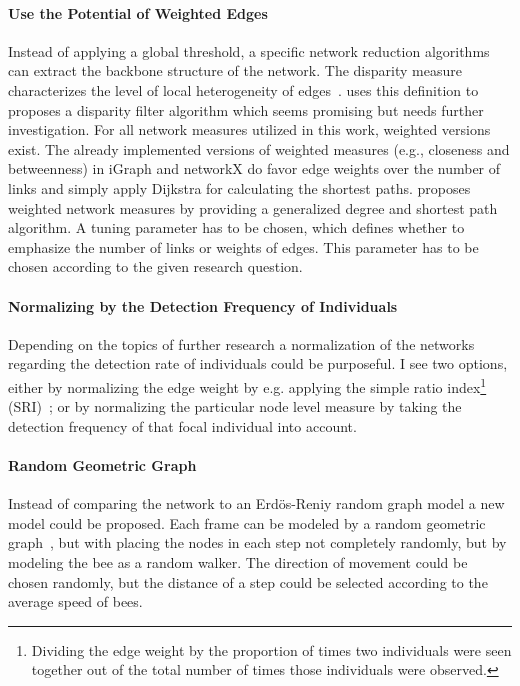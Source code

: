\paragraph{Use the Potential of Weighted Edges}
Instead of applying a global threshold, a specific network reduction algorithms can extract the backbone structure of the network. The disparity measure characterizes the level of local heterogeneity of edges~\cite{barthelemy2003spatial}. \textcite{serrano2009extracting} uses this definition to proposes a disparity filter algorithm which seems promising but needs further investigation. 
For all network measures utilized in this work, weighted versions exist. The already implemented versions of weighted measures (e.g., closeness and betweenness) in iGraph and networkX do favor edge weights over the number of links and simply apply Dijkstra for calculating the shortest paths. \textcite{opsahl2010node} proposes weighted network measures by providing a generalized degree and shortest path algorithm. A tuning parameter has to be chosen, which defines whether to emphasize the number of links or weights of edges. This parameter has to be chosen according to the given research question.

\paragraph{Normalizing by the Detection Frequency of Individuals}
Depending on the topics of further research a normalization of the networks regarding the detection rate of individuals could be purposeful. 
I see two options, either by normalizing the edge weight by e.g. applying the simple ratio index\footnote{Dividing the edge weight by the proportion of times two individuals were seen together out of the total number of times those individuals were observed.} (SRI)~\cite{formica2012fitness}; or by normalizing the particular node level measure by taking the detection frequency of that focal individual into account.

\paragraph{Random Geometric Graph}
Instead of comparing the network to an Erdös-Reniy random graph model a new model could be proposed.
Each frame can be modeled by a random geometric graph~\cite{rgg2002}, but with placing the nodes in each step not completely randomly, but by modeling the bee as a random walker. The direction of movement could be chosen randomly, but the distance of a step could be selected according to the average speed of bees. 


